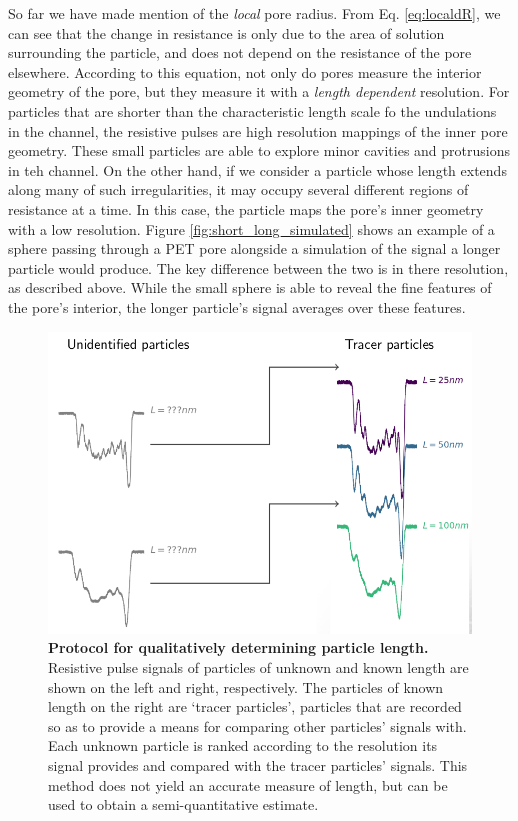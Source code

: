 			
			
			So far we have made mention of the \textit{local} pore radius. From Eq. \ref{eq:localdR}, we can see that the change in resistance is only due to the area of solution surrounding the particle, and does not depend on the resistance of the pore elsewhere. According to this equation, not only do pores measure the interior geometry of the pore, but they measure it with a \textit{length dependent} resolution. For particles that are shorter than the characteristic length scale fo the undulations in the channel, the resistive pulses are high resolution mappings of the inner pore geometry. These small particles are able to explore minor cavities and protrusions in teh channel. On the other hand, if we consider a particle whose length extends along many of such irregularities, it may occupy several different regions of resistance at a time. In this case, the particle maps the pore's inner geometry with a low resolution. Figure \ref{fig:short_long_simulated} shows an example of a sphere passing through a PET pore alongside a simulation of the signal a longer particle would produce. The key difference between the two is in there resolution, as described above. While the small sphere is able to reveal the fine features of the pore's interior, the longer particle's signal averages over these features.
			
			\begin{figure}
				\includegraphics[width=\textwidth]{qualitative_length_measurement.png}
				\caption{\textbf{Protocol for qualitatively determining particle length.} Resistive pulse signals of particles of unknown and known length are shown on the left and right, respectively. The particles of known length on the right are `tracer particles', particles that are recorded so as to provide a means for comparing other particles' signals with. Each unknown particle is ranked according to the resolution its signal provides and compared with the tracer particles' signals. This method does not yield an accurate measure of length, but can be used to obtain a semi-quantitative estimate.}
				\label{fig:qualitative_length_measurement}
			\end{figure}
			

